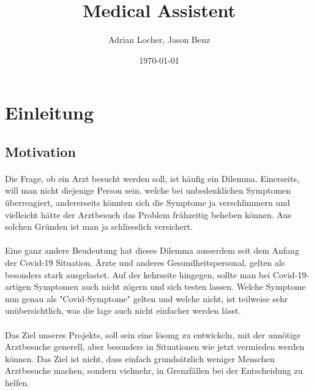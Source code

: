 \documentclass[11pt, letterpaper]{article}
\title{Medical Assistent}
\author{Adrian Locher, Jason Benz}
\date{\today}
\begin{document}
\maketitle

\newpage
\tableofcontents
\newpage


\section{Einleitung}
    \subsection{Motivation}
        \paragraph{}
            Die Frage, ob ein Arzt besucht werden soll, ist häufig ein Dilemma.
            Einerseits, will man nicht diejenige Person sein, welche bei unbedenklichen Symptomen
            überreagiert, andererseits könnten sich die Symptome ja verschlimmern und vielleicht
            hätte der Arztbesuch das Problem frühzeitig beheben können. Aus solchen Gründen ist man ja
            schliesslich versichert.

        \paragraph{}
            Eine ganz andere Beudeutung hat dieses Dilemma ausserdem seit dem Anfang
            der Covid-19 Situation. Ärzte und anderes Gesundheitspersonal, gelten als besonders
            stark ausgelastet. Auf der kehrseite hingegen, sollte man bei Covid-19-artigen Symptomen
            auch nicht zögern und sich testen lassen. Welche Symptome nun genau als "Covid-Symptome"
            gelten und welche nicht, ist teilweise sehr unübersichtlich, was die lage auch nicht
            einfacher werden lässt.

        \paragraph{}
            Das Ziel unseres Projekts, soll sein eine lösung zu entwickeln, mit der unnötige Arztbesuche
            generell, aber besonders in Situationen wie jetzt vermieden werden können.
            Das Ziel ist nicht, dass einfach grundsätzlich weniger Menschen Arztbesuche machen, sondern
            vielmehr, in Grenzfällen bei der Entscheidung zu helfen.
        
\end{document}

